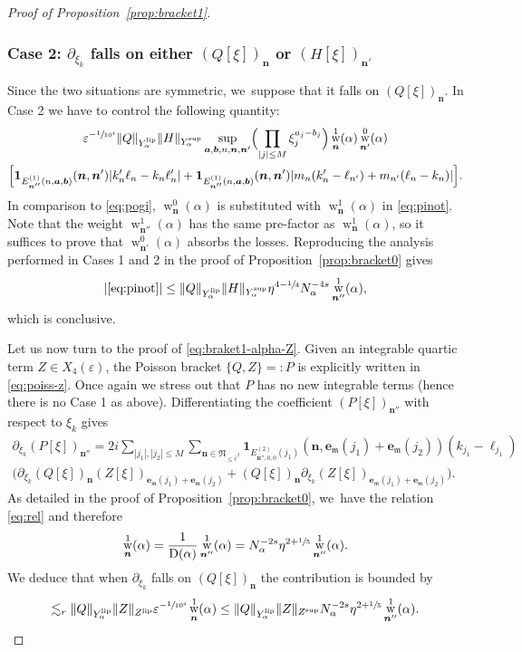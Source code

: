 \documentclass[10pt,a4paper]{amsart}
\DeclareMathOperator{\rw}{w}
\theoremstyle{plain}
\theoremstyle{definition}
\newcommand{\nb}{{\boldsymbol n}}
\newcommand{\Nb}{{\boldsymbol{\mathfrak{N}}}}
\newcommand{\1}{\mathbf{1}}
\newcommand{\Ysup}[1]{Y_{#1}^{\mathrm{sup}}}
\newcommand{\Ylip}[1]{Y_{#1}^{\mathrm{lip}}}
\let\epsilon\varepsilon
\begin{document}
\begin{proof}[Proof of Proposition~\ref{prop:bracket1}]
\subsubsection*{Case 2: $\partial_{\xi_{k}}$ falls on either $(Q[\xi])_{\nb}$ or $(H[\xi])_{\nb'}$}
Since the two situations are symmetric, we~suppose that it falls on $(Q[\xi])_{\nb}$. In Case 2 we have to control the following quantity:
\begin{multline}
\epsilon^{-\sfrac{1}{10^{4}}}
\|Q\|_{\Ylip{\alpha}}\|H\|_{\Ysup{\alpha}}
\sup_{\boldsymbol{a},\boldsymbol{b},n,\nb,\nb'}
\Bigl(\prod_{|j|\leq M}\xi_{j}^{a_{j}-b_{j}}\Bigr)\rw_{\nb}^{1}(\alpha)\rw_{\nb'}^{0}(\alpha) \\
\Big[\mathbf{1}_{E_{\nb''}^{(1)}(n,\boldsymbol{a},\boldsymbol{b})}(\nb,\nb')
|k_{n}'\ell_{n}-k_{n}\ell_{n}'|
+\mathbf{1}_{E_{\nb''}^{(1)}(n,\boldsymbol{a},\boldsymbol{b})}(\nb,\nb')
|m_{n}(k_{n}'-\ell_{n'})+m_{n'}(\ell_{n}-k_{n})|
\Big].
\label{eq:pinot}
\end{multline}
In comparison to \eqref{eq:pogi}, $\rw_{\nb}^{0}(\alpha)$ is substituted with $\rw_{\nb}^{1}(\alpha)$ in \eqref{eq:pinot}. Note that the weight $\rw_{\nb''}^{1}(\alpha)$ has the same pre-factor as $\rw_{\nb}^{1}(\alpha)$, so it suffices to prove that $\rw_{\nb'}^{0}(\alpha)$ absorbs the losses. Reproducing the analysis performed in Cases 1 and 2 in the proof of Proposition~\ref{prop:bracket0} gives
\[
|\eqref{eq:pinot}| \leq
\|Q\|_{\Ylip{\alpha}}\|H\|_{\Ysup{\alpha}}\eta^{4-\sfrac{1}{4}}N_{\alpha}^{-4s}\rw_{\nb''}^{1}(\alpha),
\]
which is conclusive.

Let us now turn to the proof of \eqref{eq:braket1-alpha-Z}. Given an integrable quartic term $Z\in X_{4}(\epsilon)$, the Poisson bracket $\{Q,Z\}=:P$ is explicitly written in \eqref{eq:poiss-z}. Once again we stress out that $P$ has no new integrable terms (hence there is no Case 1 as above). Differentiating the coefficient $(P[\xi])_{\nb''}$ with respect to $\xi_{k}$ gives
\begin{multline}
\label{eq:midi}
\partial_{\xi_{k}}(P[\xi])_{\nb''}
= 2i\sum_{|j_{1}|,|j_{2}|\leq M}
\sum_{\nb\in\Nb_{\leq\overline{r}^{2}}}
\mathbf{1}
_{E_{\nb'',0,0}^{(2)}(j_{1})}
(
\nb,
\boldsymbol{e}_{\mathfrak{m}}(j_{1})+\boldsymbol{e}_{\mathfrak{m}}(j_{2})
)
(k_{j_{1}}-\ell_{j_{1}}) \\
\Big(
\partial_{\xi_{k}}(Q[\xi])_{\nb}
(Z[\xi])_{\boldsymbol{e}_{\mathfrak{m}}(j_{1})+\boldsymbol{e}_{\mathfrak{m}}(j_{2})}
+
(Q[\xi])_{\nb}
\partial_{\xi_{k}}
(Z[\xi])_{\boldsymbol{e}_{\mathfrak{m}}(j_{1})+\boldsymbol{e}_{\mathfrak{m}}(j_{2})}
\Big).
\end{multline}
As detailed in the proof of Proposition~\ref{prop:bracket0}, we~have the relation \eqref{eq:rel} and therefore
\[
\rw_{\nb}^{1}(\alpha) = \frac{1}{\operatorname{D}(\alpha)}\rw_{\nb''}^{1}(\alpha) = N_{\alpha}^{-2s}\eta^{2+\sfrac{1}{5}}\rw_{\nb''}^{1}(\alpha).
\]
We deduce that when $\partial_{\xi_{k}}$ falls on $(Q[\xi])_{\nb}$ the contribution is bounded by
\[
\lesssim_{r}
\|Q\|_{\Ylip{\alpha}}\|Z\|_{Z^{\mathrm{lip}}}
\epsilon^{-\sfrac{1}{10^{4}}}
\rw_{\nb}^{1}(\alpha)
\leq
\|Q\|_{\Ylip{\alpha}}\|Z\|_{Z^{\mathrm{sup}}}
N_{\alpha}^{-2s}\eta^{2+\sfrac{1}{5}}
\rw_{\nb''}^{1}(\alpha).
\]


\end{proof}
\end{document}
